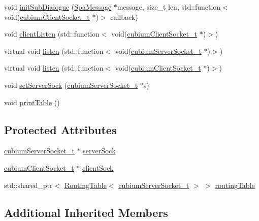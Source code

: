 \begin{DoxyCompactItemize}
\item 
void \hyperlink{classLocalCommunicator_a8ed10b0a1f9be12597a2e095b7b8fb3e}{init\+Sub\+Dialogue} (\hyperlink{structSpaMessage}{Spa\+Message} $\ast$message, size\+\_\+t len, std\+::function$<$ void(\hyperlink{structcubiumClientSocket__t}{cubium\+Client\+Socket\+\_\+t} $\ast$)$>$ callback)
\item 
void \hyperlink{classLocalCommunicator_a03deedab1d3f79fe328a21aa2d5c6bfb}{client\+Listen} (std\+::function$<$ void(\hyperlink{structcubiumClientSocket__t}{cubium\+Client\+Socket\+\_\+t} $\ast$)$>$)
\item 
virtual void \hyperlink{classLocalCommunicator_a320a09f88a1eb840e517753b603cd08b}{listen} (std\+::function$<$ void(\hyperlink{structcubiumServerSocket__t}{cubium\+Server\+Socket\+\_\+t} $\ast$)$>$)
\item 
virtual void \hyperlink{classLocalCommunicator_a33c7148ee35ec38773b7b4c8f32c643c}{listen} (std\+::function$<$ void(\hyperlink{structcubiumClientSocket__t}{cubium\+Client\+Socket\+\_\+t} $\ast$)$>$)
\item 
void \hyperlink{classLocalCommunicator_a3321b932c8c555587b8b3200bc4dfcdb}{set\+Server\+Sock} (\hyperlink{structcubiumServerSocket__t}{cubium\+Server\+Socket\+\_\+t} $\ast$s)
\item 
void \hyperlink{classLocalCommunicator_a96569a4dc0b07439ab880385428a53f7}{print\+Table} ()
\end{DoxyCompactItemize}
\subsection*{Protected Attributes}
\begin{DoxyCompactItemize}
\item 
\hyperlink{structcubiumServerSocket__t}{cubium\+Server\+Socket\+\_\+t} $\ast$ \hyperlink{classLocalCommunicator_a4c0d8806e53030c1af6124cd55a34335}{server\+Sock}
\item 
\hyperlink{structcubiumClientSocket__t}{cubium\+Client\+Socket\+\_\+t} $\ast$ \hyperlink{classLocalCommunicator_af52bd4819c3dc433bd27d3dbefbaac70}{client\+Sock}
\item 
std\+::shared\+\_\+ptr$<$ \hyperlink{classRoutingTable}{Routing\+Table}$<$ \hyperlink{structcubiumServerSocket__t}{cubium\+Server\+Socket\+\_\+t} $>$ $>$ \hyperlink{classLocalCommunicator_ac28392070111396dabbadbbcb81a7ef7}{routing\+Table}
\end{DoxyCompactItemize}
\subsection*{Additional Inherited Members}


